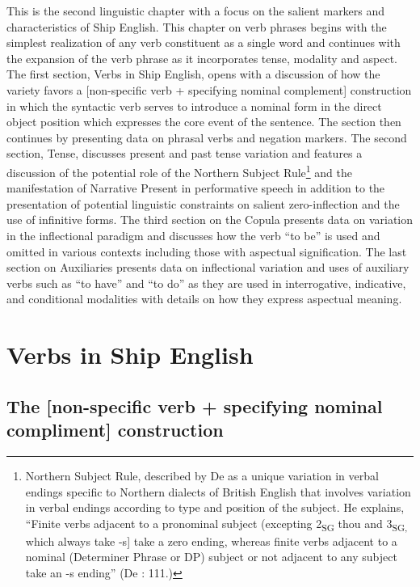 This is the second linguistic chapter with a focus on the salient markers and characteristics of Ship English. This chapter on verb phrases begins with the simplest realization of any verb constituent as a single word and continues with the expansion of the verb phrase as it incorporates tense, modality and aspect. The first section, Verbs in Ship English, opens with a discussion of how the variety favors a [non-specific verb + specifying nominal complement] construction in which the syntactic verb serves to introduce a nominal form in the direct object position which expresses the core event of the sentence.  The section then continues by presenting data on phrasal verbs and negation markers. The second section, Tense, discusses present and past tense variation and features a discussion of the potential role of the Northern Subject Rule\footnote{Northern Subject Rule, described by De \citet{Haas2006} as a unique variation in verbal endings specific to Northern dialects of British English that involves variation in verbal endings according to type and position of the subject. He explains, “Finite verbs adjacent to a pronominal subject (excepting 2\textsubscript{SG} thou and 3\textsubscript{SG,} which always take -s] take a zero ending, whereas finite verbs adjacent to a nominal (Determiner Phrase or DP) subject or not adjacent to any subject take an -s ending” (De \citealt{Haas2006}: 111.)} and the manifestation of Narrative Present in performative speech in addition to the presentation of potential linguistic constraints on salient zero-inflection and the use of infinitive forms. The third section on the Copula presents data on variation in the inflectional paradigm and discusses how the verb “to be” is used and omitted in various contexts including those with aspectual signification. The last section on Auxiliaries presents data on inflectional variation and uses of auxiliary verbs such as “to have” and “to do” as they are used in interrogative, indicative, and conditional modalities with details on how they express aspectual meaning. 

\section{{Verbs} {in} {Ship} {English}}%

\subsection{{The} {[non-specific} {verb} {+} {specifying} {nominal} {compliment]} {construction}}%

